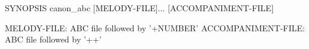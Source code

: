 SYNOPSIS
  canon_abc [MELODY-FILE]... [ACCOMPANIMENT-FILE]

  MELODY-FILE: ABC file followed by '+NUMBER'
  ACCOMPANIMENT-FILE: ABC file followed by '++'
